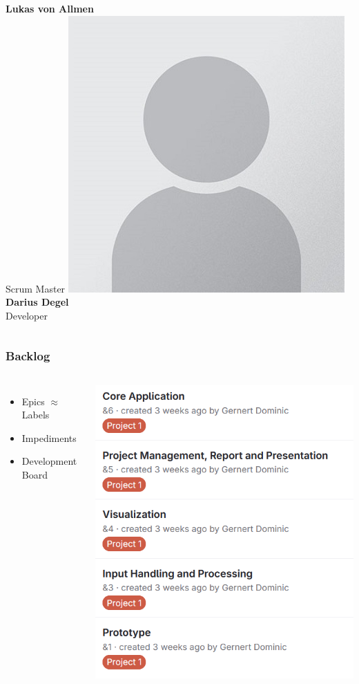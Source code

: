 \begin{frame}
\begin{columns}
        \textbf{Lukas von Allmen} \\ \small{Scrum Master}
        \centering
        \includegraphics[width=0.45\linewidth]{../assets/avatar_placeholder.jpg} \\
        \textbf{Darius Degel} \\ \small{Developer}
    \end{columns}
\end{frame}

\begin{frame}
    \frametitle{Backlog}
    \begin{columns}
        \begin{itemize}
            \large
            \item Epics \ensuremath{\approx} Labels
            \item Impediments
            \item Development Board
        \end{itemize}
        \includegraphics[width=0.8\linewidth]{../assets/epics_interim_presentation.png}
    \end{columns}
\end{frame}

